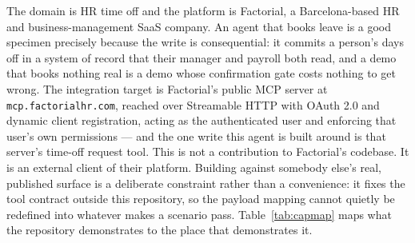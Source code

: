 \documentclass[11pt,a4paper]{article}
\begin{document}
The domain is HR time off and the platform is Factorial, a Barcelona-based HR
and business-management SaaS company. An agent that books leave is a good
specimen precisely because the write is consequential: it commits a person's
days off in a system of record that their manager and payroll both read, and a
demo that books nothing real is a demo whose confirmation gate costs nothing to
get wrong. The integration target is Factorial's public MCP server at
\texttt{mcp.factorialhr.com}, reached over Streamable HTTP with OAuth 2.0 and
dynamic client registration, acting as the authenticated user and enforcing
that user's own permissions --- and the one write this agent is built around is
that server's time-off request tool. This is not a contribution to Factorial's
codebase. It is an external client of their platform. Building against somebody
else's real, published surface is a deliberate constraint rather than a
convenience: it fixes the tool contract outside this repository, so the payload
mapping cannot quietly be redefined into whatever makes a scenario pass.
Table~\ref{tab:capmap} maps what the repository demonstrates to the place that
demonstrates it.
\end{document}
